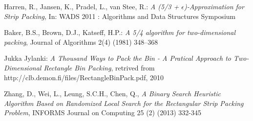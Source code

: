 \documentclass{article}
\begin{document}
\begin{thebibliography}{9}
  Harren, R., Jansen, K., Pradel, L., van Stee, R.:
  \emph{A (5/3 + $\epsilon$)-Approximation for Strip Packing},
  In: WADS 2011 : Algorithms and Data Structures Symposium

  Baker, B.S., Brown, D.J., Katseff, H.P.:
  \emph{A 5/4 algorithm for two-dimensional packing},
  Journal of Algorithms 2(4) (1981) 348–368

  Jukka Jylanki:
  \emph{A Thousand Ways to Pack the Bin - A Pratical Approach to Two-Dimensional Rectangle Bin Packing},
  retrived from http://clb.demon.fi/files/RectangleBinPack.pdf, 2010

  Zhang, D., Wei, L., Leung, S.C.H., Chen, Q.,
  \emph{A Binary Search Heuristic Algorithm Based on Randomized Local Search for the Rectangular Strip Packing Problem},
  INFORMS Journal on Computing 25 (2) (2013) 332-345
\end{thebibliography}
\end{document}
